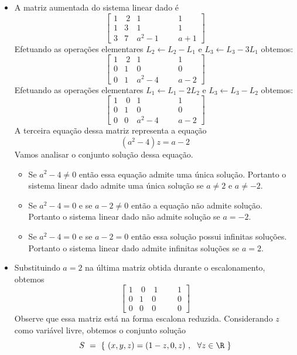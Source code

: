 \begin{solution}
\begin{itemize}
\item[(a)]
A matriz aumentada do sistema linear dado é
$$ \left[\begin{array}{rrcr|rc}
  1 & \ 2 &   1     & & &   1    \\
  1 &   3 &   1     & & &   1    \\ 
  3 &   7 &  a^2-1  & & &   a+1  \end{array}\right] $$
Efetuando as operações elementares $L_2 \leftarrow L_2 - L_1$ e $L_3 \leftarrow L_3 - 3L_1$ obtemos:
$$ \left[\begin{array}{rrcr|rc}
  1 & \ 2 &   1     & & &   1    \\
  0 &   1 &   0     & & &   0    \\ 
  0 &   1 &  a^2-4  & & &   a-2  \end{array}\right] $$
Efetuando as operações elementares $L_1 \leftarrow L_1 - 2L_2$ e $L_3 \leftarrow L_3 - L_2$ obtemos:
$$ \left[\begin{array}{rrcr|rc}
  1 & \ 0 &   1     & & &   1    \\
  0 &   1 &   0     & & &   0    \\ 
  0 &   0 &  a^2-4  & & &   a-2  \end{array}\right] $$
A terceira equação dessa matriz representa a equação
$$(a^2-4)z = a-2$$
Vamos analisar o conjunto solução dessa equação.
\begin{itemize}
\item[$\bullet$] Se $a^2-4 \neq 0$ então essa equação admite uma única solução. Portanto o sistema linear dado admite uma única solução se
$a \neq 2$ e $a \neq -2$.
\item[$\bullet$] Se $a^2-4 = 0$ e se $a-2 \neq 0$ então a equação não admite solução. Portanto o sistema linear dado não admite solução se $a=-2$.
\item[$\bullet$] Se $a^2-4 = 0$ e se $a-2 = 0$ então essa solução possui infinitas soluções. Portanto o sistema linear dado admite infinitas soluções se $a=2$.
\end{itemize}


\item[(b)] Substituindo $a=2$ na última matriz obtida durante o escalonamento, obtemos
$$ \left[\begin{array}{rrrr|rc}
  1 & \ 0 &  \ 1     & & &   1    \\
  0 &   1 &    0     & & &   0    \\ 
  0 &   0 &    0     & & &   0  \end{array}\right] $$
Observe que essa matriz está na forma escalona reduzida. Considerando $z$ como variável livre, obtemos o conjunto solução
$$S\ =\ \{\ (x,y,z) = (1-z,0,z) \ , \ \ \forall z \in \R \ \}$$
\end{itemize}
\end{solution}

